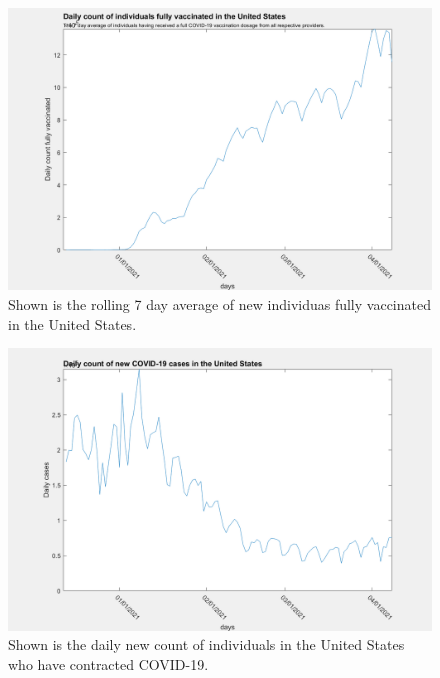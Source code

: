 \documentclass[twoside]{article}
\begin{document}
\begin{multicols}{2}
\begin{figure}[H]
	\includegraphics[width=\linewidth]{images/usa_daily_fully_vaccinated_processed.png}
	\caption{Shown is the rolling 7 day average of new individuas fully vaccinated in the United States.}
	\label{fig:images/usa_daily_fully_vaccinated_processedLabel}
\end{figure}

\begin{figure}[H]
	\includegraphics[width=\linewidth]{images/usa_daily_cases_unprocessed.png}
	\caption{Shown is the daily new count of individuals in the United States who have contracted COVID-19.}
	\label{fig:images/usa_daily_cases_unprocessedLabel}
\end{figure}


\end{multicols}
\end{document}
